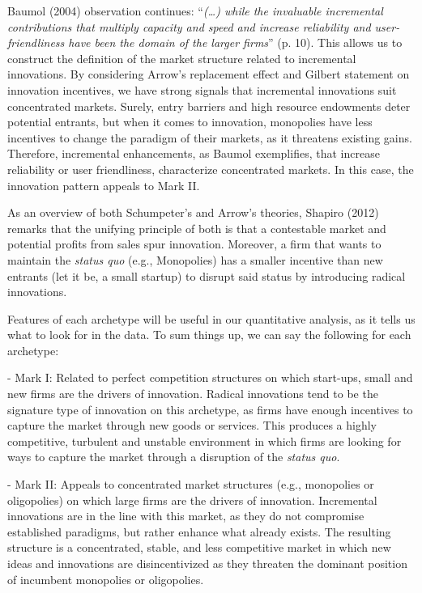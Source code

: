 \documentclass[12pt,a4paper]{article}
\begin{document}
Baumol (2004) observation continues: “\textit{(…) while the invaluable incremental contributions that multiply capacity and speed and increase reliability and user-friendliness have been the domain of the larger firms}” (p. 10). This allows us to construct the definition of the market structure related to incremental innovations. By considering Arrow’s replacement effect and Gilbert statement on innovation incentives, we have strong signals that incremental innovations suit concentrated markets. Surely, entry barriers and high resource endowments deter potential entrants, but when it comes to innovation, monopolies have less incentives to change the paradigm of their markets, as it threatens existing gains. Therefore, incremental enhancements, as Baumol exemplifies, that increase reliability or user friendliness, characterize concentrated markets. In this case, the innovation pattern appeals to Mark II.  

As an overview of both Schumpeter’s and Arrow’s theories, Shapiro (2012) remarks that the unifying principle of both is that a contestable market and potential profits from sales spur innovation. Moreover, a firm that wants to maintain the \textit{status quo} (e.g., Monopolies) has a smaller incentive than new entrants (let it be, a small startup) to disrupt said status by introducing radical innovations. 

Features of each archetype will be useful in our quantitative analysis, as it tells us what to look for in the data. To sum things up, we can say the following for each archetype: 

- Mark I: Related to perfect competition structures on which start-ups, small and new firms are the drivers of innovation. Radical innovations tend to be the signature type of innovation on this archetype, as firms have enough incentives to capture the market through new goods or services. This produces a highly competitive, turbulent and unstable environment in which firms are looking for ways to capture the market through a disruption of the \textit{status quo}.  

- Mark II: Appeals to concentrated market structures (e.g., monopolies or oligopolies) on which large firms are the drivers of innovation. Incremental innovations are in the line with this market, as they do not compromise established paradigms, but rather enhance what already exists. The resulting structure is a concentrated, stable, and less competitive market in which new ideas and innovations are disincentivized as they threaten the dominant position of incumbent monopolies or oligopolies. 
\end{document}
